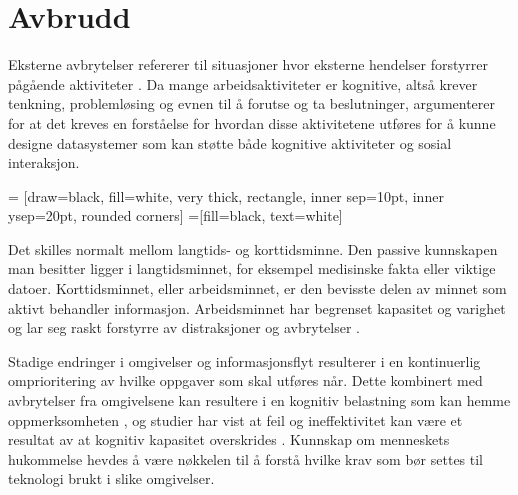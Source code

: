 \section{Avbrudd}
\label{sec:avbrudd}
Eksterne avbrytelser refererer til situasjoner hvor eksterne hendelser forstyrrer pågående aktiviteter \citep{Harr07}. Da mange arbeidsaktiviteter er kognitive, altså krever tenkning, problemløsing og evnen til å forutse og ta beslutninger, argumenterer \citet{Rogers94} for at det kreves en forståelse for hvordan disse aktivitetene utføres for å kunne designe datasystemer som kan støtte både kognitive aktiviteter og sosial interaksjon.

 = [draw=black, fill=white, very thick,
    rectangle, inner sep=10pt, inner ysep=20pt, rounded corners]
 =[fill=black, text=white]
%

\noindent
Det skilles normalt mellom langtids- og korttidsminne. Den passive kunnskapen man besitter ligger i langtidsminnet, for eksempel medisinske fakta eller viktige datoer. Korttidsminnet, eller arbeidsminnet, er den bevisste delen av minnet som aktivt behandler informasjon. Arbeidsminnet har begrenset kapasitet og varighet og lar seg raskt forstyrre av distraksjoner og avbrytelser \citep{Parker00}. 

\noindent
Stadige endringer i omgivelser og informasjonsflyt resulterer i en kontinuerlig omprioritering av hvilke oppgaver som skal utføres når. Dette kombinert med avbrytelser fra omgivelsene kan resultere i en kognitiv belastning som kan hemme oppmerksomheten \citep{Ebright10}, og studier har vist at feil og ineffektivitet kan være et resultat av at kognitiv kapasitet overskrides \citep{Parker00}. Kunnskap om menneskets hukommelse hevdes å være nøkkelen til å forstå hvilke krav som bør settes til teknologi brukt i slike omgivelser.

